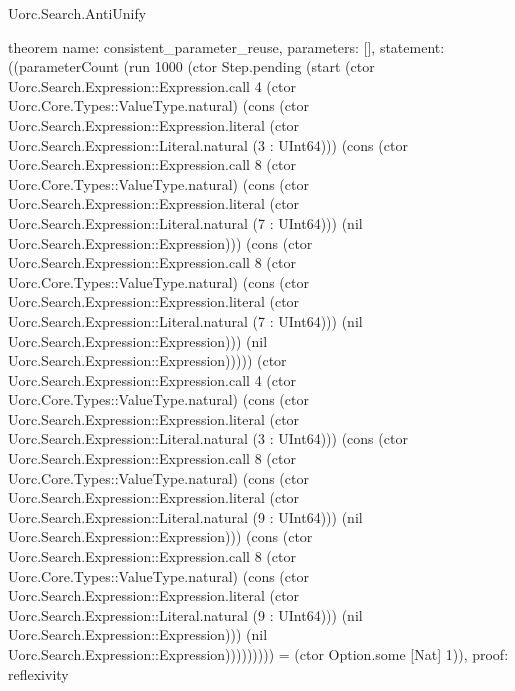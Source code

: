 \begin{lexlean}{Uorc.Search.AntiUnify}
\begin{semanticmodule}
theorem{
  name: consistent_parameter_reuse,
  parameters: [],
  statement: ((parameterCount (run 1000 (ctor Step.pending (start (ctor Uorc.Search.Expression::Expression.call 4 (ctor Uorc.Core.Types::ValueType.natural) (cons (ctor Uorc.Search.Expression::Expression.literal (ctor Uorc.Search.Expression::Literal.natural (3 : UInt64))) (cons (ctor Uorc.Search.Expression::Expression.call 8 (ctor Uorc.Core.Types::ValueType.natural) (cons (ctor Uorc.Search.Expression::Expression.literal (ctor Uorc.Search.Expression::Literal.natural (7 : UInt64))) (nil Uorc.Search.Expression::Expression))) (cons (ctor Uorc.Search.Expression::Expression.call 8 (ctor Uorc.Core.Types::ValueType.natural) (cons (ctor Uorc.Search.Expression::Expression.literal (ctor Uorc.Search.Expression::Literal.natural (7 : UInt64))) (nil Uorc.Search.Expression::Expression))) (nil Uorc.Search.Expression::Expression))))) (ctor Uorc.Search.Expression::Expression.call 4 (ctor Uorc.Core.Types::ValueType.natural) (cons (ctor Uorc.Search.Expression::Expression.literal (ctor Uorc.Search.Expression::Literal.natural (3 : UInt64))) (cons (ctor Uorc.Search.Expression::Expression.call 8 (ctor Uorc.Core.Types::ValueType.natural) (cons (ctor Uorc.Search.Expression::Expression.literal (ctor Uorc.Search.Expression::Literal.natural (9 : UInt64))) (nil Uorc.Search.Expression::Expression))) (cons (ctor Uorc.Search.Expression::Expression.call 8 (ctor Uorc.Core.Types::ValueType.natural) (cons (ctor Uorc.Search.Expression::Expression.literal (ctor Uorc.Search.Expression::Literal.natural (9 : UInt64))) (nil Uorc.Search.Expression::Expression))) (nil Uorc.Search.Expression::Expression))))))))) = (ctor Option.some [Nat] 1)),
  proof: reflexivity{}
}


\end{semanticmodule}
\end{lexlean}
